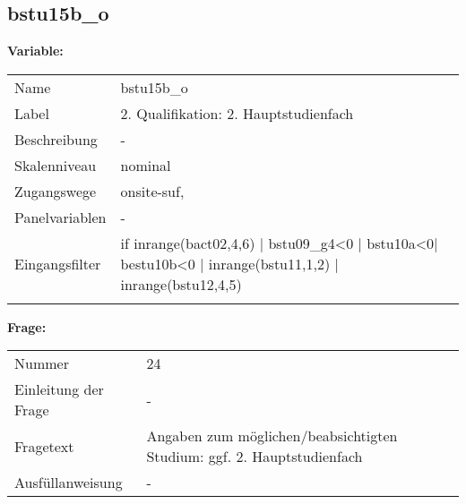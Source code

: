	
	
	\subsection{bstu15b\_o}
	\label{subSection:bstu15b_o}

	\noindent\textbf{Variable:}\\
		\begin{tabular}{lL{11.3cm}}
			\label{tableVariable:bstu15b_o}
			Name & bstu15b\_o \\
			Label & 2. Qualifikation: 2. Hauptstudienfach \\
			Beschreibung & - \\
			Skalenniveau & nominal \\
			Zugangswege &
				onsite-suf,
 \\
			Panelvariablen & -
			 \\
			Eingangsfilter & if inrange(bact02,4,6) | bstu09\_g4\textless{}0 | bstu10a\textless{}0| bestu10b\textless{}0 | inrange(bstu11,1,2) | inrange(bstu12,4,5) \\
 \\
		\end{tabular}

		\vspace*{1 cm}
		\noindent\textbf{Frage:}\\
		\begin{tabular}{lL{11.3cm}}
			\label{tableQuestion:bstu15b_o}
			Nummer & 24 \\
			Einleitung der Frage & - \\
			Fragetext & Angaben zum möglichen/beabsichtigten Studium:
ggf. 2. Hauptstudienfach \\
			Ausfüllanweisung & - \\
		\end{tabular}





